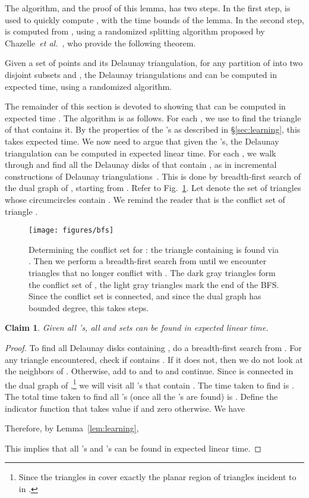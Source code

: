 \documentclass{siamltex}
\newcommand{\etal}{\emph{et al.}}
\newtheorem{claim}[theorem]{Claim}
\begin{document}
The algorithm, and the proof of this lemma, has two steps.  In
the first step,  is used to quickly compute ,
with the time bounds of the lemma.  In the second step,
 is computed from , using a
randomized splitting algorithm proposed by Chazelle~\etal~\cite{CDH+},
who provide the following theorem.
\begin{theorem} \cite[Theorem~3]{CDH+} 
Given a set of  points  and its Delaunay 
triangulation, for any partition of  into two disjoint subsets  
and , the Delaunay triangulations  and  can be computed 
in  expected time, using a randomized algorithm.
\end{theorem}

The remainder of this section 
is devoted to showing that  can be computed in 
expected time .
The algorithm is as follows.
For each , we use  to find the 
triangle  of  that
contains it. By the properties of the 's as described in
\S\ref{sec:learning}, 
this takes  expected time. We now need
to argue that given the 's, the Delaunay triangulation
 can be computed in expected linear time.
For each , we walk through
 and find all the Delaunay disks of  that
contain , as in incremental
constructions of Delaunay triangulations~\cite[Chapter~9]{deBergKrOvSc00}.
This is done by breadth-first search of the 
dual graph of , starting from .
Refer to Fig.~\ref{fig:bfs}.
Let  denote the set of triangles whose circumcircles contain
. We remind the reader that  is the conflict set
of triangle .
\begin{figure}
\begin{center}
\texttt{[image: figures/bfs]}
\end{center}
\caption{Determining the conflict set for :
the triangle  containing  is found via .
Then we perform a breadth-first search from  until
we encounter triangles that no longer conflict with .
The dark gray triangles form the conflict set of , the 
light gray triangles mark the end of the BFS. Since the conflict
set  is connected, and since the dual graph has
bounded degree, this takes  steps.} \label{fig:bfs}
\end{figure}

\begin{claim} \label{clm:getting-si} 
Given all 's, all  and  sets 
can be found in expected linear time.
\end{claim}

\begin{proof} 
To find all Delaunay disks containing , do a breadth-first search
from . For any triangle  encountered, check
if  contains . If it does not, then
we do not look at the neighbors of . Otherwise, add 
 to  and  to  and continue.
Since  is connected in the dual graph of 
,\footnote{Since the triangles in  cover exactly
the planar region of triangles incident to  in
.} we will visit
all 's that contain .
The time taken
to find  is .
The total time taken
to find all 's (once all the 's are found)
is . Define the indicator function  that
takes value  if  and zero otherwise.  We have

Therefore, by Lemma~\ref{lem:learning},

This implies that all 's and 's can
be found in expected linear time.
\end{proof}
\medskip
\end{document}
